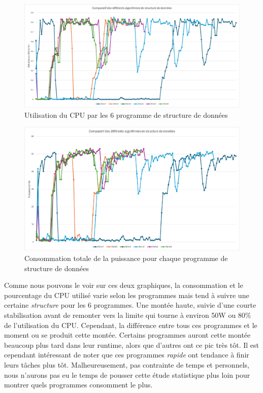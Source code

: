 \documentclass[12pt, a4paper]{report}
\begin{document}
\begin{figure}[H]
    \includegraphics[width=1\linewidth]{res/graph/Datastructure/cpuuse_datastruct.png}
    \caption{Utilisation du CPU par les 6 programme de structure de données}
    \label{fig:cpuuse_datastruct}
\end{figure}
\begin{figure}[H]
    \includegraphics[width=1\linewidth]{res/graph/Datastructure/power_datastruct.png}
    \caption{Consommation totale de la puissance pour chaque programme de structure de données}
    \label{fig:power_datastruct}
\end{figure}

Comme nous pouvons le voir sur ces deux graphiques, la consommation et le pourcentage du CPU utilisé varie selon les programmes mais tend à suivre une certaine \textit{structure} pour les 6 programmes. Une montée haute, suivie d'une courte stabilisation avant de remonter vers la limite qui tourne à environ 50W ou 80\% de l'utilisation du CPU.
Cependant, la différence entre tous ces programmes et le moment ou se produit cette montée. Certains programmes auront cette montée beaucoup plus tard dans leur runtime, alors que d'autres ont ce pic très tôt. Il est cependant intéressant de noter que ces programmes \textit{rapide} ont tendance à finir leurs tâches plus tôt.
Malheureusement, pas contrainte de temps et personnels, nous n'aurons pas eu le temps de pousser cette étude statistique plus loin pour montrer quels programmes consomment le plus.
\end{document}
